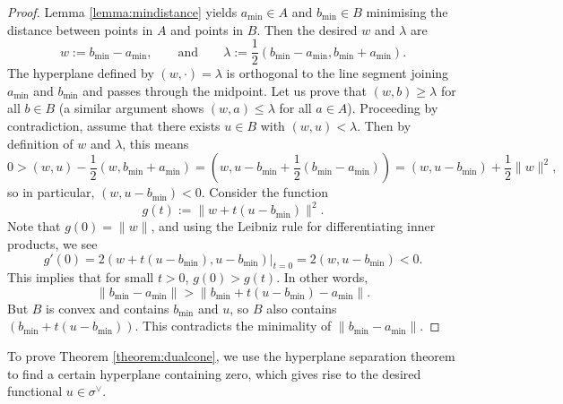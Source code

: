 \documentclass[12pt]{amsart}
\theoremstyle{plain}
\begin{document}
\begin{proof}
Lemma \ref{lemma:mindistance} yields $a_{\text{min}} \in A$ and $b_{\text{min}} \in B$ minimising the distance between points in $A$ and points in $B$.
Then the desired $w$ and $\lambda$ are
$$w := b_{\text{min}} - a_{\text{min}}, \qquad\text{and}\qquad \lambda := \frac{1}{2}(b_{\text{min}} - a_{\text{min}}, b_{\text{min}} + a_{\text{min}}).$$
The hyperplane defined by $(w, \cdot) = \lambda$ is orthogonal to the line segment joining $a_{\text{min}}$ and $b_{\text{min}}$ and passes through the midpoint.
Let us prove that $(w, b) \ge \lambda$ for all $b \in B$ (a similar argument shows $(w, a) \le \lambda$ for all $a \in A$).
Proceeding by contradiction, assume that there exists $u \in B$ with $(w, u) < \lambda$.
Then by definition of $w$ and $\lambda$, this means 
$$0 > (w, u) -\frac{1}{2}(w, b_{\text{min}}+a_{\text{min}}) = (w, u-b_{\text{min}}+\frac{1}{2} (b_{\text{min}}-a_{\text{min}})) =(w, u-b_{\text{min}})+\frac{1}{2}\|w\|^2,$$
so in particular, $(w, u-b_{\text{min}})<0$.
Consider the function
$$g(t):=\|w+t(u-b_{\text{min}})\|^2.$$
Note that $g(0)=\|w\|$, and using the Leibniz rule for differentiating inner products, we see
$$g'(0) = 2 (w+t(u-b_{\text{min}}), u-b_{\text{min}}) \big|_{t=0} = 2 (w, u-b_{\text{min}}) < 0.$$
This implies that for small $t > 0$, $g(0) > g(t)$.
In other words,
$$\|b_{\text{min}} - a_{\text{min}}\| > \|b_{\text{min}} + t(u - b_{\text{min}}) - a_{\text{min}}\|.$$
But $B$ is convex and contains $b_{\text{min}}$ and $u$, so $B$ also contains $(b_{\text{min}} + t (u - b_{\text{min}}))$.
This contradicts the minimality of $\|b_{\text{min}} - a_{\text{min}}\|$.
\end{proof}

To prove Theorem \ref{theorem:dualcone}, we use the hyperplane separation theorem to find a certain hyperplane containing zero, which gives rise to the desired functional $u\in\sigma^\vee$.
\end{document}
